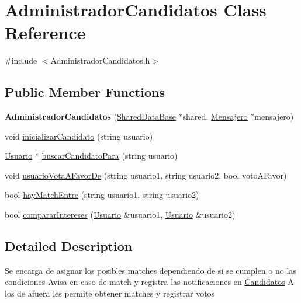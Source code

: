 \hypertarget{classAdministradorCandidatos}{}\section{Administrador\+Candidatos Class Reference}
\label{classAdministradorCandidatos}


{\ttfamily \#include $<$Administrador\+Candidatos.\+h$>$}

\subsection*{Public Member Functions}
\begin{DoxyCompactItemize}
\item 
{\bfseries Administrador\+Candidatos} (\hyperlink{classSharedDataBase}{Shared\+Data\+Base} $\ast$shared, \hyperlink{classMensajero}{Mensajero} $\ast$mensajero)\hypertarget{classAdministradorCandidatos_aa1476ca2bb83e5e931c3c03378e1eb99}{}\label{classAdministradorCandidatos_aa1476ca2bb83e5e931c3c03378e1eb99}

\item 
void \hyperlink{classAdministradorCandidatos_aa5b67a2e1ecb99cb12427fc59cbe1fa8}{inicializar\+Candidato} (string usuario)
\item 
\hyperlink{classUsuario}{Usuario} $\ast$ \hyperlink{classAdministradorCandidatos_a5a27cb9f07ec5c10a92ff9002e3d009a}{buscar\+Candidato\+Para} (string usuario)
\item 
void \hyperlink{classAdministradorCandidatos_a0c59aa4d5c06f8a7b48c04b0380293ee}{usuario\+Vota\+A\+Favor\+De} (string usuario1, string usuario2, bool voto\+A\+Favor)
\item 
bool \hyperlink{classAdministradorCandidatos_a5b64e63a07f2289bc72296d3b523f2ef}{hay\+Match\+Entre} (string usuario1, string usuario2)
\item 
bool \hyperlink{classAdministradorCandidatos_ab0ac32f8834aff9bfb7aa4da33bfe57c}{comparar\+Intereses} (\hyperlink{classUsuario}{Usuario} \&usuario1, \hyperlink{classUsuario}{Usuario} \&usuario2)
\end{DoxyCompactItemize}


\subsection{Detailed Description}
Se encarga de asignar los posibles matches dependiendo de si se cumplen o no las condiciones Avisa en caso de match y registra las notificaciones en \hyperlink{classCandidatos}{Candidatos} A los de afuera les permite obtener matches y registrar votos 

